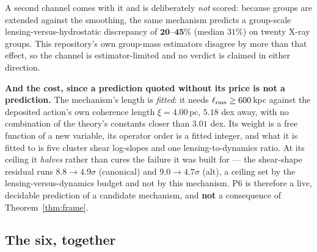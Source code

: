 \documentclass[11pt,letterpaper]{article}
\begin{document}
A second channel comes with it and is deliberately \emph{not} scored: because groups are extended against the smoothing, the same mechanism predicts a group-scale lensing-versus-hydrostatic discrepancy of $\mathbf{20}$--$\mathbf{45\%}$ (median $31\%$) on twenty X-ray groups. This repository's own group-mass estimators disagree by more than that effect, so the channel is estimator-limited and no verdict is claimed in either direction.

\textbf{And the cost, since a prediction quoted without its price is not a prediction.} The mechanism's length is \emph{fitted}: it needs $\ell_{\rm rms}\ge600$\,kpc against the deposited action's own coherence length $\xi=4.00$\,pc, $5.18$ dex away, with no combination of the theory's constants closer than $3.01$ dex. Its weight is a free function of a new variable, its operator order is a fitted integer, and what it is fitted to is five cluster shear log-slopes and one lensing-to-dynamics ratio. At its ceiling it \emph{halves} rather than cures the failure it was built for --- the shear-shape residual runs $8.8\to4.9\sigma$ (canonical) and $9.0\to4.7\sigma$ (alt), a ceiling set by the lensing-versus-dynamics budget and not by this mechanism. P6 is therefore a live, decidable prediction of a candidate mechanism, and \textbf{not} a consequence of Theorem~\ref{thm:frame}.

\subsection{The six, together}
\end{document}
